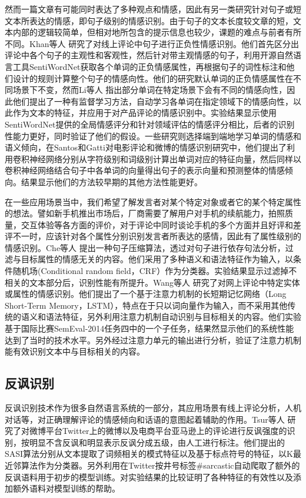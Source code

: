 然而一篇文章有可能同时表达了多种观点和情感，因此有另一类研究针对句子或短文本所表达的情感，即句子级别的情感识别。由于句子的文本长度较文章的短，文本内部的逻辑较简单，但相对地所包含的提示信息也较少，课题的难点与前者有所不同。Khan等人 \cite{khan2011sentiment} 研究了对线上评论中句子进行正负性情感识别。他们首先区分出评论中各个句子的主观性和客观性，然后针对带主观情感的句子，利用开源自然语言工具SentiWordNet获取各个单词的正负情感属性，再根据句子的词性标注和他们设计的规则计算整个句子的情感向性。他们的研究默认单词的正负情感属性在不同场景下不变，然而Li等人\cite{li2013constructing} 指出部分单词在特定场景下会有不同的情感向性，因此他们提出了一种有监督学习方法，自动学习各单词在指定领域下的情感向性，以此作为文本的特征，并应用于对产品评论的情感识别中。实验结果显示使用SentiWordNet提供的全局情感评分和针对领域评估的情感评分相比，后者的识别性能力更好，同时验证了他们的假设。一些研究则选择端到端地学习单词的情感和语义倾向，在Santos和Gatti\cite{dos2014deep}对电影评论和微博的情感识别研究中，他们提出了利用卷积神经网络分别从字符级别和词级别计算出单词对应的特征向量，然后同样以卷积神经网络结合句子中各单词的向量得出句子的表示向量和预测整体的情感倾向。结果显示他们的方法较早期的其他方法性能更好。

在一些应用场景当中，我们希望了解发言者对某个特定对象或者它的某个特定属性的想法。譬如新手机推出市场后，厂商需要了解用户对手机的续航能力，拍照质量，交互体验等各方面的评价，对于评论中同时谈论手机的多个方面并且好评和差评不一时，应该针对各个属性分别识别发言者所表达的感情，因此有了属性级别的情感识别。Che等人 \cite{che2015sentence} 提出一种句子压缩算法，透过对句子进行依存句法分析，过滤与目标属性的情感无关的内容。他们采用了多种语义和语法特征作为输入，以条件随机场(Conditional random field，CRF）作为分类器。实验结果显示过滤掉不相关的文本部分后，识别性能有所提升。Wang等人 \cite{wang2016attention}研究了对网上评论中特定实体或属性的情感识别。他们提出了一个基于注意力机制的长短期记忆网络（Long Short-Term Memory，LSTM），特点在于只以词向量作为输入，而不采用其他传统的语义和语法特征，另外利用注意力机制自动识别与目标相关的内容。他们实验基于国际比赛SemEval-2014任务四中的一个子任务，结果然显示他们的系统性能达到了当时的技术水平。另外经过注意力单元的输出进行分析，验证了注意力机制能有效识别文本中与目标相关的内容。

\subsection{反讽识别}

反讽识别技术作为很多自然语言系统的一部分，其应用场景有线上评论分析，人机对话等，对正确理解评论的情感倾向和话语的意图起着辅助的作用。Tsur等人 \cite{tsur2010icwsm} \cite{davidov2010semi}研究了对微博平台Twitter上的微博以及电商平台亚马逊上的评论进行反讽强度的识别，按明显不含反讽和明显表示反讽分成五级，由人工进行标注。他们提出的SASI算法分别从文本提取了词频相关的模式特征以及基于标点符号的特征，以K最近邻算法作为分类器。另外利用在Twitter按井号标签\#sarcastic自动爬取了额外的反讽语料用于初步的模型训练。对实验结果的比较证明了各种特征的有效性以及添加额外语料对模型训练的帮助。

